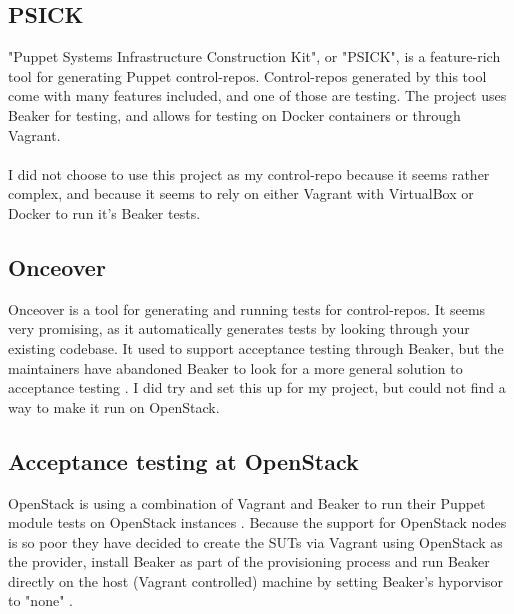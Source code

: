 \subsection{PSICK}

"Puppet Systems Infrastructure Construction Kit"\cite{psickgithub}, or "PSICK", is a feature-rich tool for generating Puppet control-repos. Control-repos generated by this tool come with many features included, and one of those are testing. The project uses Beaker for testing, and allows for testing on Docker containers or through Vagrant.
\\
\\
I did not choose to use this project as my control-repo because it seems rather complex, and because it seems to rely on either Vagrant with VirtualBox or Docker to run it's Beaker tests.

\subsection{Onceover}

Onceover\cite{onceovergithub} is a tool for generating and running tests for control-repos. It seems very promising, as it automatically generates tests by looking through your existing codebase. It used to support acceptance testing through Beaker, but the maintainers have abandoned Beaker to look for a more general solution to acceptance testing \cite{onceoverbeakerpr}. I did try and set this up for my project, but could not find a way to make it run on OpenStack.

\subsection{Acceptance testing at OpenStack}

OpenStack is using a combination of Vagrant and Beaker to run their Puppet module tests on OpenStack instances \cite{puppetmodulefunctionaltestingbeakerinsidevagrant}\cite{openstackpuppetmodulefunctionaltestingproposal}. Because the support for OpenStack nodes is so poor they have decided to create the SUTs via Vagrant using OpenStack as the provider, install Beaker as part of the provisioning process and run Beaker directly on the host (Vagrant controlled) machine by setting Beaker's hyporvisor to "none" \cite{puppetmodulefunctionaltestingbeakerinsidevagrantnodeexample}\cite{openstackci}.


